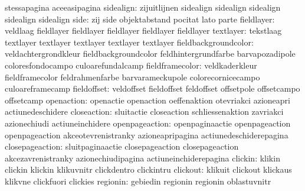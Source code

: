                            stessapagina              aceeasipagina
   sidealign: zijuitlijnen sidealign
              sidealign    sidealign
              sidealign    sidealign
                     side: zij                       side
                           objektabstand             pocitat
                           lato                      parte
 fieldlayer: veldlaag                  fieldlayer
             fieldlayer                fieldlayer
             fieldlayer                fieldlayer
textlayer: tekstlaag                 textlayer
           textlayer                 textlayer
           textlayer                 textlayer
     fieldbackgroundcolor: veldachtergrondkleur      fieldbackgroundcolor
                           feldhintergrundfarbe      barvapozadipole
                           coloresfondocampo         culoarefundalcamp
          fieldframecolor: veldkaderkleur            fieldframecolor
                           feldrahmenfarbe           barvarameckupole
                           colorecornicecampo        culoareframecamp
              fieldoffset: veldoffset                fieldoffset
                           feldoffset                offsetpole
                           offsetcampo               offsetcamp
               openaction: openactie                 openaction
                           oeffenaktion              otevriakci
                           azioneapri                actiunedeschidere
              closeaction: sluitactie                closeaction
                           schliessenaktion          zavriakci
                           azionechiudi              actiuneinchidere
           openpageaction: openpaginaactie           openpageaction
                           openpageaction            akceotevrenistranky
                           azioneapripagina          actiunedeschiderepagina %
          closepageaction: sluitpaginaactie          closepageaction
                           closepageaction           akcezavrenistranky
                           azionechiudipagina        actiuneinchiderepagina %
                  clickin: klikin                    clickin
                           klickin                   klikuvnitr
                           clickdentro               clickintru
                 clickout: klikuit                   clickout
                           klickaus                  klikvne
                           clickfuori                clickies
                 regionin: gebiedin                  regionin
                           regionin                  oblastuvnitr
